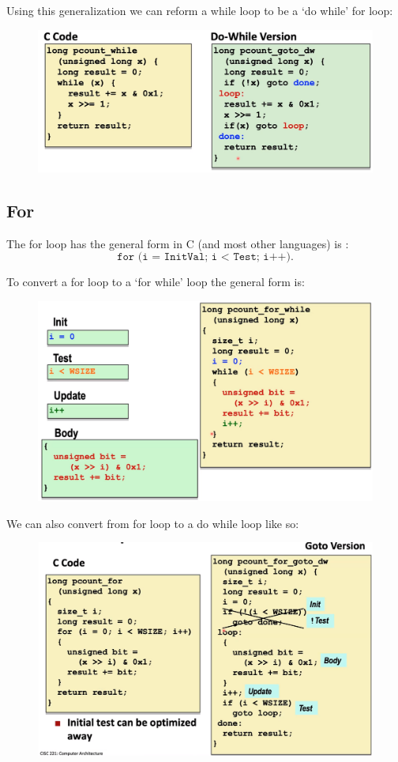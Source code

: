 \documentclass[12pt]{book}
\begin{document}
Using this generalization we can reform a while loop to be a `do while' for loop:
\begin{figure}[h]
        \centering
        \includegraphics[scale = 0.4]{./figures/whileDoWhile}
\end{figure}

\subsection*{For}
The for loop has the general form in C (and most other languages) is :
\[
\texttt{for (i = InitVal; i < Test; i++)}
.\] 

To convert a for loop to a `for while' loop the general form is:
\begin{figure}[h]
        \centering
        \includegraphics[scale = 0.2]{./figures/forWhile}
\end{figure}
\pagebreak

We can also convert from for loop to a do while loop like so:
\begin{figure}[h]
        \centering
        \includegraphics[scale = 0.3]{./figures/forDoWhile}
\end{figure}
\end{document}

